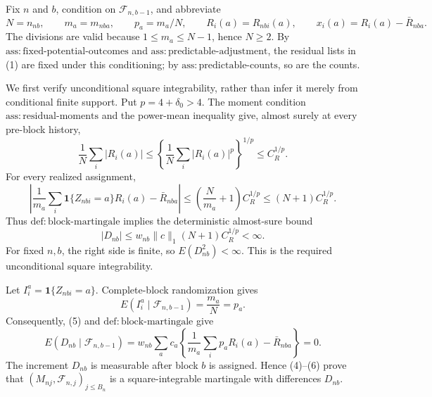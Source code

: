 Fix \(n\) and \(b\), condition on \(\mathcal F_{n,b-1}\), and abbreviate
\[
N=n_{nb},\qquad m_a=m_{nba},\qquad p_a=m_a/N,
\qquad R_i(a)=R_{nbi}(a),\qquad x_i(a)=R_i(a)-\bar R_{nba}.
\tag{1}
\]
The divisions are valid because \(1\le m_a\le N-1\), hence \(N\ge2\). By \(\mathrm{ass:fixed\text{-}potential\text{-}outcomes}\) and \(\mathrm{ass:predictable\text{-}adjustment}\), the residual lists in (1) are fixed under this conditioning; by \(\mathrm{ass:predictable\text{-}counts}\), so are the counts.

We first verify unconditional square integrability, rather than infer it merely from conditional finite support. Put \(p=4+\delta_0>4\). The moment condition \(\mathrm{ass:residual\text{-}moments}\) and the power-mean inequality give, almost surely at every pre-block history,
\[
\frac1N\sum_i|R_i(a)|
\le\left\{\frac1N\sum_i|R_i(a)|^p\right\}^{1/p}
\le C_R^{1/p}.
\tag{2}
\]
For every realized assignment,
\[
\left|\frac1{m_a}\sum_i\mathbf1\{Z_{nbi}=a\}R_i(a)-\bar R_{nba}\right|
\le\left(\frac N{m_a}+1\right)C_R^{1/p}
\le(N+1)C_R^{1/p}.
\tag{3}
\]
Thus \(\mathrm{def:block\text{-}martingale}\) implies the deterministic almost-sure bound
\[
|D_{nb}|\le w_{nb}\|c\|_1(N+1)C_R^{1/p}<\infty.
\tag{4}
\]
For fixed \(n,b\), the right side is finite, so \(E(D_{nb}^2)<\infty\). This is the required unconditional square integrability.

Let \(I_i^a=\mathbf1\{Z_{nbi}=a\}\). Complete-block randomization gives
\[
E(I_i^a\mid\mathcal F_{n,b-1})=\frac{m_a}{N}=p_a.
\tag{5}
\]
Consequently, (5) and \(\mathrm{def:block\text{-}martingale}\) give
\[
E(D_{nb}\mid\mathcal F_{n,b-1})
=w_{nb}\sum_ac_a\left\{\frac1{m_a}\sum_i p_aR_i(a)-\bar R_{nba}\right\}=0.
\tag{6}
\]
The increment \(D_{nb}\) is measurable after block \(b\) is assigned. Hence (4)--(6) prove that \((M_{nj},\mathcal F_{n,j})_{j\le B_n}\) is a square-integrable martingale with differences \(D_{nb}\).

